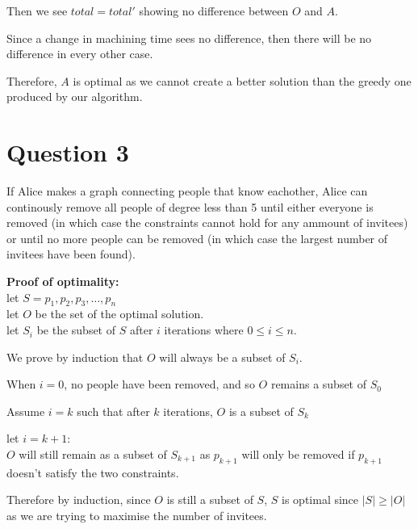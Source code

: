 \documentclass{article}
\begin{document}
Then we see $total = total'$ showing no difference between $O$ and $A$.

Since a change in machining time sees no difference, then there will be no difference in every other case.

Therefore, $A$ is optimal as we cannot create a better solution than the greedy one produced by our algorithm.

\section*{Question 3}
If Alice makes a graph connecting people that know eachother, Alice can continously remove all people of degree less than 5 until either everyone is removed (in which case the constraints cannot hold for any ammount of invitees) or until no more people can be removed (in which case the largest number of invitees have been found).

\textbf{Proof of optimality:}\\
let $S = {p_1, p_2, p_3, \ldots, p_n}$\\
let $O$ be the set of the optimal solution.\\
let $S_i$ be the subset of $S$ after $i$ iterations where $0 \leq i \leq n$.

We prove by induction that $O$ will always be a subset of $S_i$.

When $i = 0$, no people have been removed, and so $O$ remains a subset of $S_0$

Assume $i = k$ such that after $k$ iterations, $O$ is a subset of $S_k$

let $i = k + 1$:\\
$O$ will still remain as a subset of $S_{k+1}$ as $p_{k+1}$ will only be removed if $p_{k+1}$ doesn't satisfy the two constraints.

Therefore by induction, since $O$ is still a subset of $S$, $S$ is optimal since $|S| \geq |O|$ as we are trying to maximise the number of invitees.
\end{document}

